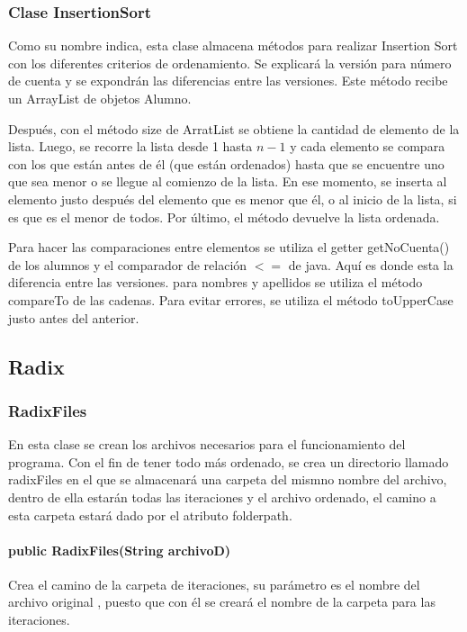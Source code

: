 \documentclass[11pt]{article}
\begin{document}
\subsubsection{Clase InsertionSort}
Como su nombre indica, esta clase almacena métodos para realizar Insertion Sort con los diferentes criterios de ordenamiento. Se explicará la versión para número de cuenta y se expondrán las diferencias entre las versiones. Este método recibe un ArrayList de objetos Alumno. 
\par
Después, con el método size de ArratList se obtiene la cantidad de elemento de la lista. Luego, se recorre la lista desde 1 hasta $n-1$ y cada elemento se compara con los que están antes de él (que están ordenados) hasta que se encuentre uno que sea menor o se llegue al comienzo de la lista. En ese momento, se inserta al elemento justo después del elemento que es menor que él, o al inicio de la lista, si es que es el menor de todos. Por último, el método devuelve la lista ordenada.
\par 
Para hacer las comparaciones entre elementos se utiliza el getter getNoCuenta() de los alumnos y el comparador de relación $<=$ de java. Aquí es donde esta la diferencia entre las versiones. para nombres y apellidos se utiliza el método compareTo de las cadenas. Para evitar errores, se utiliza el método toUpperCase justo antes del anterior.

\subsection{Radix}
\subsubsection{RadixFiles}
En esta clase se crean los archivos necesarios para el funcionamiento del programa. Con el fin de tener todo más ordenado, se crea un directorio llamado radixFiles en el que se almacenará una carpeta del mismno nombre del archivo, dentro de ella estarán todas las iteraciones y el archivo ordenado, el camino a esta carpeta estará dado por el atributo folderpath. 

\paragraph{public RadixFiles(String archivoD)}
Crea el camino de la carpeta de iteraciones, su parámetro es el nombre del archivo original , puesto que con él se creará el nombre de la carpeta para las iteraciones. 
\end{document}
